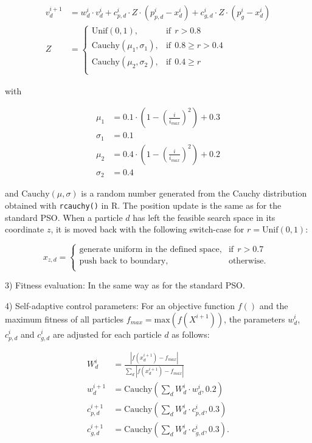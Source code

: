 \documentclass[
  oneside, a4paper, 12pt, openany]{book}
\theoremstyle{definition}
\theoremstyle{definition}
\theoremstyle{definition}
\theoremstyle{definition}
\theoremstyle{remark}
\begin{document}
\begin{align*}
  v_d^{i+1} &= w_d^i \cdot v_d^{i}+c_{p,d}^i \cdot Z \cdot (p_{p,d}^i-x_d^i) + c_{g,d}^i \cdot Z \cdot (p_{g}^i-x_d^i) \\
  Z &= \begin{cases}
    \text{Unif}(0,1), & \text{if}\ \ r > 0.8\\
    \text{Cauchy}(\mu_1, \sigma_1), & \text{if}\ \ 0.8 \geq r > 0.4\\
    \text{Cauchy}(\mu_2, \sigma_2), & \text{if}\ \ 0.4 \geq r\\
  \end{cases}
\end{align*}

with

\begingroup
\allowdisplaybreaks

\begin{align*}
  \mu_1 &= 0.1 \cdot (1-(\frac{i}{i_{max}})^2) + 0.3 \\
  \sigma_1 &= 0.1 \\
  \mu_2 &= 0.4 \cdot (1-(\frac{i}{i_{max}})^2) + 0.2 \\
  \sigma_2 &= 0.4
\end{align*}
\endgroup

and \(\text{Cauchy}(\mu, \sigma)\) is a random number generated from the Cauchy distribution obtained with \texttt{rcauchy()} in R. The position update is the same as for the standard PSO. When a particle \(d\) has left the feasible search space in its coordinate \(z\), it is moved back with the following switch-case for \(r = \text{Unif}(0,1)\):

\[
  x_{z,d} = 
  \begin{cases}
    \text{generate uniform in the defined space}, & \text{if}\ \ r > 0.7\\
    \text{push back to boundary}, & \text{otherwise.}\ \ \\
  \end{cases}
\]

3) Fitness evaluation: In the same way as for the standard PSO.

4) Self-adaptive control parameters: For an objective function \(f()\) and the maximum fitness of all particles \(f_{max} = \text{max}(f(X^{i+1}))\), the parameters \(w_d^{i}\), \(c_{p,d}^{i}\) and \(c_{g,d}^{i}\) are adjusted for each particle \(d\) as follows:

\begin{align*}
  W^i_d &= \frac{\left| f(x_d^{i+1})-f_{max} \right|}{\sum_d\left| f(x_d^{i+1})-f_{max} \right|} \\
  w_d^{i+1} &= \text{Cauchy}(\sum_d W^i_d \cdot w_d^{i}, 0.2) \\
  c_{p,d}^{i+1} &= \text{Cauchy}(\sum_d W^i_d \cdot c_{p,d}^{i}, 0.3) \\
  c_{g,d}^{i+1} &= \text{Cauchy}(\sum_d W^i_d \cdot c_{g,d}^{i}, 0.3).
\end{align*}
\end{document}
